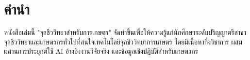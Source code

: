 \chapter*{คำนำ}
\begin{contentbox}
หนังสือเล่มนี้ "จุลชีววิทยาสำหรับการเกษตร" จัดทำขึ้นเพื่อให้ความรู้แก่นักศึกษาระดับปริญญาตรีสาขาจุลชีววิทยาและเกษตรกรทั่วไปที่สนใจเทคโนโลยีจุลชีววิทยาการเกษตร โดยมีเนื้อหากึ่งวิชาการ ผสมผสานการประยุกต์ใช้ AI อ้างอิงงานวิจัยจริง และข้อมูลเชิงปฏิบัติสำหรับเกษตรกร
\end{contentbox}

